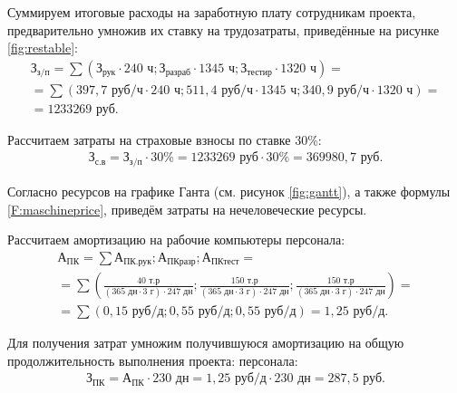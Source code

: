 Суммируем итоговые расходы на заработную плату сотрудникам проекта, предварительно умножив их ставку на трудозатраты, приведённые на рисунке \ref{fig:restable}:
\begin{equation}
\begin{aligned}
	\text{З}_\text{з/п}=\sum{(\text{З}_\text{рук}\cdot240\text{ ч}; \text{З}_\text{разраб} \cdot 1345\text{ ч}; \text{З}_\text{тестир} \cdot 1320\text{ ч})} =\\=\sum{(397,7\text{ руб/ч} \cdot 240\text{ ч}; 511,4\text{ руб/ч} \cdot 1345\text{ ч}; 340,9\text{ руб/ч} \cdot 1320\text{ ч})} =\\= 1 233 269 \text{ руб}.
\end{aligned}
\end{equation}

Рассчитаем затраты на страховые взносы по ставке 30\%:
\begin{equation}
	\begin{aligned}
		\text{З}_\text{с.в}=\text{З}_\text{з/п}\cdot 30 \%= 1 233 269 \text{ руб} \cdot 30\% = 369 980,7 \text{ руб}.
	\end{aligned}
\end{equation}

Согласно ресурсов на графике Ганта (см. рисунок \ref{fig:gantt}), а также формулы \ref{F:maschineprice}, приведём затраты на нечеловеческие ресурсы.

Рассчитаем амортизацию на рабочие компьютеры персонала:
\begin{equation}
	\begin{aligned}
		\text{А}_\text{ПК}=\sum{\text{А}_\text{ПК.рук}; \text{А}_\text{ПКразр}; \text{А}_\text{ПКтест}}=\\=\sum{(\frac{40 \text{ т.р}}{(365\text{ дн} \cdot 3\text{ г}) \cdot 247\text{ дн}}; \frac{150 \text{ т.р}}{(365\text{ дн} \cdot 3\text{ г}) \cdot 247\text{ дн}}; \frac{150 \text{ т.р}}{(365\text{ дн} \cdot 3\text{ г}) \cdot 247\text{ дн}})}=\\=\sum{(0,15 \text{ руб/д}; 0,55 \text{ руб/д}; 0,55 \text{ руб/д})}=1,25 \text{ руб/д}.
	\end{aligned}
\end{equation}

Для получения затрат умножим получившуюся амортизацию на общую продолжительность выполнения проекта:
персонала:
\begin{equation}
	\begin{aligned}
		\text{З}_\text{ПК}=\text{А}_\text{ПК} \cdot 230 \text{ дн} = 1,25 \text{ руб/д} \cdot 230 \text{ дн} = 287,5 \text{ руб}.
	\end{aligned}
\end{equation}

